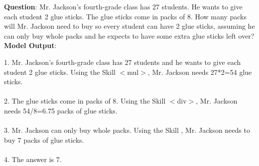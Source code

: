 \documentclass{article} %
\begin{document}
\newpage




\begin{tcolorbox}[title = {GSM8K}, colback = Apricot!25!white, colframe = BrickRed!75!black] 
\textbf{Question}: Mr. Jackson’s fourth-grade class has 27 students. He wants to give each student 2 glue sticks. The glue sticks  come in packs of 8. How many packs will Mr. Jackson need to buy so every student can have 2 glue sticks, assuming he can only buy whole packs and he expects to have some extra glue sticks left over?
\tcblower
\textbf{Model Output}:


\quad


1. Mr. Jackson’s fourth-grade class has 27 students and he wants to give each student 2 glue sticks. Using the Skill $<$mul$>$, Mr. Jackson needs 27*2=54 glue sticks. \\ \\
2. The glue sticks come in packs of 8. Using the Skill $<$div$>$, Mr. Jackson needs 54/8=6.75  packs of glue sticks. \\ \\
3. Mr. Jackson can only buy whole packs. Using the Skill ,  Mr. Jackson needs to buy 7 packs of glue sticks.  \\ \\
4. The answer is 7.
\end{tcolorbox}
\noindent\begin{minipage}{\textwidth}
 \label{Tab:example_compose_gsm8k_skill_3}
\end{minipage}


\newpage
\end{document}
